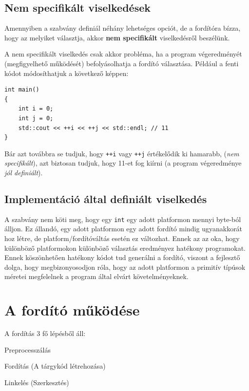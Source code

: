 \documentclass[a4paper,11.5pt,table]{article}
\begin{document}
	\subsection{Nem specifikált viselkedések}
	Amennyiben a szabvány definiál néhány lehetséges opciót, de a fordítóra bízza, hogy az melyiket választja, akkor \textbf{nem specifikált} viselkedésről beszélünk.
	
  A nem specifikált viselkedés csak akkor probléma, ha a program végeredményét (megfigyelhető működését) befolyásolhatja a fordító választása. Például a fenti kódot módosíthatjuk a következő képpen:

	\begin{lstlisting}
int main()
{
	int i = 0;
	int j = 0;
	std::cout << ++i << ++j << std::endl; // 11
}
	\end{lstlisting}
	Bár azt továbbra se tudjuk, hogy \texttt{++i} vagy \texttt{++j} értékelődik ki hamarabb, (\textit{nem specifikált}), azt biztosan tudjuk, hogy 11-et fog kiírni (a program végeredménye \textit{jól definiált}).

	\subsection{Implementáció által definiált viselkedés}
	A szabvány nem köti meg, hogy egy \texttt{int} egy adott platformon mennyi byte-ból álljon. Ez állandó, egy adott platformon egy adott fordító mindig ugyanakkorát hoz létre, de platform/fordítóváltás esetén ez változhat. Ennek az az oka, hogy különböző platformokon különböző választás eredményez hatékony programokat. Ennek köszönhetően hatékony kódot tud generálni a fordító, viszont a fejlesztő dolga, hogy megbizonyosodjon róla, hogy az adott platformon a primitív típúsok méretei megfelelnek a program által elvárt követelményeknek.
	
	\section{A fordító működése}
	A fordítás 3 fő lépésből áll:
	\begin{compactenum}
		\item Preprocesszálás
		\item Fordítás (A tárgykód létrehozása)
		\item Linkelés (Szerkesztés)
	\end{compactenum}
	
\end{document}
